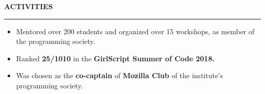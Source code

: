\documentclass[a4paper, 12pt]{article}
\begin{document}
\Large{\textbf{ACTIVITIES}}\vspace{-0.5cm}\newline
\rule{19cm}{0.01cm}
\vspace{-0.4cm}
\begin{itemize}
\item{\normalsize{Mentored over 200 students and organized over 15 workshops, as member of the programming society.}}\vspace{-1.3cm}\newline
\item{\normalsize{Ranked \textbf{25/1010} in the \textbf{GirlScript Summer of Code 2018.}}}\vspace{-1.3cm}\newline
\item{\normalsize{Was chosen as the \textbf{co-captain} of \textbf{Mozilla Club} of the institute's programming society.}}
\end{itemize}
\end{document}
